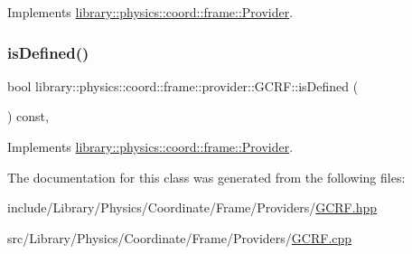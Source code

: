 Implements \hyperlink{classlibrary_1_1physics_1_1coord_1_1frame_1_1_provider_a796fd2dd337f1304a0e9acf573ce2550}{library\+::physics\+::coord\+::frame\+::\+Provider}.

\mbox{\label{classlibrary_1_1physics_1_1coord_1_1frame_1_1provider_1_1_g_c_r_f_a0e6155c096ff1c231b14e59544fe038c}} 
\subsubsection{\texorpdfstring{is\+Defined()}{isDefined()}}
{\footnotesize\ttfamily bool library\+::physics\+::coord\+::frame\+::provider\+::\+G\+C\+R\+F\+::is\+Defined (\begin{DoxyParamCaption}{ }\end{DoxyParamCaption}) const\hspace{0.3cm}{\ttfamily [override]}, {\ttfamily [virtual]}}



Implements \hyperlink{classlibrary_1_1physics_1_1coord_1_1frame_1_1_provider_ae7cd093febf2b20f71400f9f79442774}{library\+::physics\+::coord\+::frame\+::\+Provider}.



The documentation for this class was generated from the following files\+:\begin{DoxyCompactItemize}
\item 
include/\+Library/\+Physics/\+Coordinate/\+Frame/\+Providers/\hyperlink{_g_c_r_f_8hpp}{G\+C\+R\+F.\+hpp}\item 
src/\+Library/\+Physics/\+Coordinate/\+Frame/\+Providers/\hyperlink{_g_c_r_f_8cpp}{G\+C\+R\+F.\+cpp}\end{DoxyCompactItemize}
